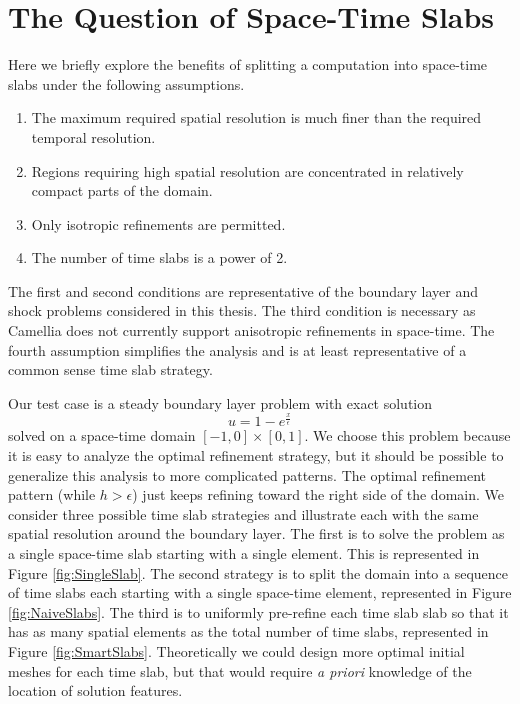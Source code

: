 \documentclass[Dissertation.tex]{subfiles}
\begin{document}
\section{The Question of Space-Time Slabs}
Here we briefly explore the benefits of splitting a computation into space-time slabs under the following assumptions.
\begin{enumerate}
\item The maximum required spatial resolution is much finer than the required temporal resolution.
\item Regions requiring high spatial resolution are concentrated in relatively compact parts of the domain.
\item Only isotropic refinements are permitted.
\item The number of time slabs is a power of 2.
\end{enumerate}
The first and second conditions are representative of the boundary layer and 
shock problems considered in this thesis.
The third condition is necessary as Camellia does not currently support anisotropic refinements in space-time.
The fourth assumption simplifies the analysis and is at least representative of a common sense time slab strategy.

Our test case is a steady boundary layer problem with exact solution
\[
u=1-e^\frac{x}{\epsilon}
\]
solved on a space-time domain $[-1,0]\times[0,1]$.
We choose this problem because it is easy to analyze the optimal refinement strategy, but it should be
possible to generalize this analysis to more complicated patterns.
The optimal refinement pattern (while $h > \epsilon$) just keeps refining toward the right side of the domain.
We consider three possible time slab strategies and illustrate each with the same spatial resolution around the boundary layer. 
The first is to solve the problem as a single space-time slab starting with a single element. 
This is represented in Figure \ref{fig:SingleSlab}.
The second strategy is to split the domain into a sequence of time slabs each starting with a single space-time element, represented in Figure \ref{fig:NaiveSlabs}.
The third is to uniformly pre-refine each time slab slab so that it has as many spatial elements as the total number of time slabs, represented in Figure \ref{fig:SmartSlabs}.
Theoretically we could design more optimal initial meshes for each time slab, but that would 
require \emph{a priori} knowledge of the location of solution features.


\end{document}
